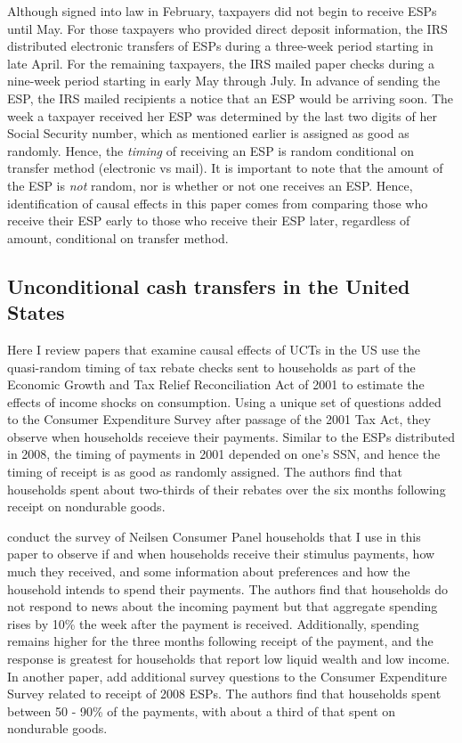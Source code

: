 \documentclass[12pt]{article}
\begin{document}
Although signed into law in February, taxpayers did not begin to receive ESPs until May.
For those taxpayers who provided direct deposit information, the IRS distributed electronic transfers of ESPs during a three-week period starting in late April.
For the remaining taxpayers, the IRS mailed paper checks during a nine-week period starting in early May through July.
In advance of sending the ESP, the IRS mailed recipients a notice that an ESP would be arriving soon.
The week a taxpayer received her ESP was determined by the last two digits of her Social Security number, which as mentioned earlier is assigned as good as randomly.
Hence, the \textit{timing} of receiving an ESP is random conditional on transfer method (electronic vs mail).
It is important to note that the amount of the ESP is \textit{not} random, nor is whether or not one receives an ESP.
Hence, identification of causal effects in this paper comes from comparing those who receive their ESP early to those who receive their ESP later, regardless of amount, conditional on transfer method.

\subsection{Unconditional cash transfers in the United States}

Here I review papers that examine causal effects of UCTs in the US \textcite{johnson2006household} use the quasi-random timing of tax rebate checks sent to households as part of the Economic Growth and Tax Relief Reconciliation Act of 2001 to estimate the effects of income shocks on consumption.
Using a unique set of questions added to the Consumer Expenditure Survey after passage of the 2001 Tax Act, they observe when households receieve their payments.
Similar to the ESPs distributed in 2008, the timing of payments in 2001 depended on one's SSN, and hence the timing of receipt is as good as randomly assigned.
The authors find that households spent about two-thirds of their rebates over the six months following receipt on nondurable goods.

\textcite{broda2014economic} conduct the survey of Neilsen Consumer Panel households that I use in this paper to observe if and when households receive their stimulus payments, how much they received, and some information about preferences and how the household intends to spend their payments.
The authors find that households do not respond to news about the incoming payment but that aggregate spending rises by 10\% the week after the payment is received.
Additionally, spending remains higher for the three months following receipt of the payment, and the response is greatest for households that report low liquid wealth and low income.
In another paper, \textcite{parker2013consumer} add additional survey questions to the Consumer Expenditure Survey related to receipt of 2008 ESPs.
The authors find that households spent between 50 - 90\% of the payments, with about a third of that spent on nondurable goods.
\end{document}
